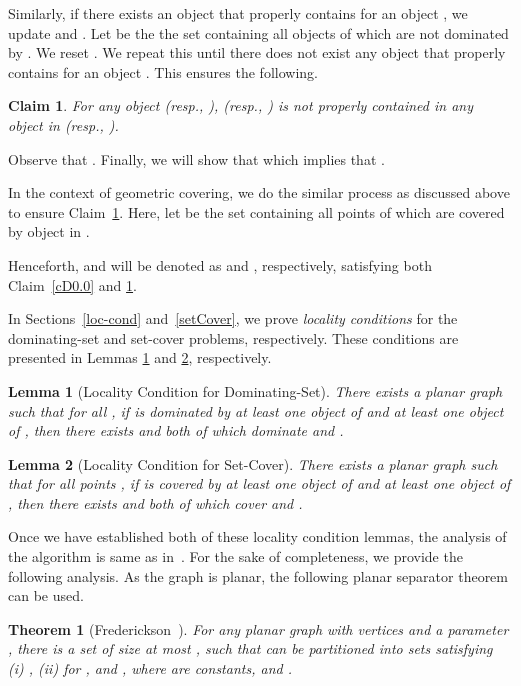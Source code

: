 \documentclass[a4paper,11pt]{article}
\newtheorem{theorem}{Theorem}
\newtheorem{lemma}{Lemma}
\newtheorem{claim}{Claim}
\begin{document}
Similarly, if there exists an object  that properly contains  for an object , we  update  and .  Let   be the the set containing  all objects of  which
are not dominated by . We reset . We repeat this until there does not exist any object  that properly contains  for an object . This ensures the following. 

\begin{claim}\label{cD0.1}
 For any object  (resp., ),   (resp.,  )  is not properly
  contained in any object in   (resp.,  ).
\end{claim}


Observe that .
Finally, we  will show that   which implies 
that . 

In the context of geometric covering,  we do the similar process as discussed above to ensure Claim~\ref{cD0.1}.  Here, let  be the set containing all 
points of  which  are
covered by
object in .

{Henceforth,  and  will be denoted as  and , respectively, satisfying both Claim~\ref{cD0.0} and \ref{cD0.1}.}

In Sections~\ref{loc-cond} and~\ref{setCover}, we prove \emph{locality conditions} for the dominating-set and set-cover problems, respectively. These conditions are presented in Lemmas \ref{lem_loc_dom} and \ref{lem_loc_cov}, respectively.

\begin{lemma}[Locality Condition for Dominating-Set]\label{lem_loc_dom}
 There exists a planar graph  
such that for all 
, if  is dominated by at least one object of  and at least one object of , then there exists  and  both of which dominate  and .
\end{lemma}

\begin{lemma}[Locality Condition for Set-Cover]
\label{lem_loc_cov}
 There exists a planar graph  
such that for all points
, if  is covered by at least one object  of  and at least one object of , then there exists  and  both of which cover  and .  
\end{lemma}

Once we have established both of these
locality condition lemmas, the analysis of the 
algorithm is same 
as in~\cite{MustafaR10}. 
For the sake of completeness, we provide the following analysis.
As  the graph  is planar, the following planar separator theorem can 
be used.

\begin{theorem}[Frederickson~\cite{Frederickson87}]\label{THseparator}
 For any planar graph   {with}  vertices  {and a parameter },  there is 
a set  of size at most , such that   can be 
partitioned into  { sets } 
satisfying (i) 
, (ii)  for 
, and 
, where  are 
constants, and .  
\end{theorem}
\end{document}
